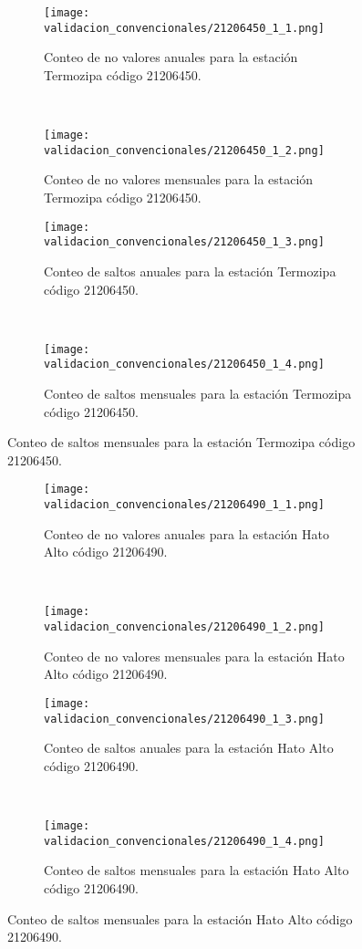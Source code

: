 \begin{figure}[H]\ContinuedFloat
\centering
	\begin{subfigure}[normla]{0.4\textwidth}
	\texttt{[image: validacion\_convencionales/21206450\_1\_1.png]}
		\caption{Conteo de no valores anuales para la estación Termozipa código 21206450.}
		\label{subfig:a1}
		\end{subfigure}
		~
    \begin{subfigure}[normla]{0.4\textwidth}
	\texttt{[image: validacion\_convencionales/21206450\_1\_2.png]}
		\caption{Conteo de no valores mensuales para la estación Termozipa código 21206450.}
		\label{subfig:a2}
		\end{subfigure}
		
    \begin{subfigure}[normla]{0.4\textwidth}
	\texttt{[image: validacion\_convencionales/21206450\_1\_3.png]}
		\caption{Conteo de saltos anuales para la estación Termozipa código 21206450.}
		\label{subfig:a1}
		\end{subfigure}
		~
    \begin{subfigure}[normla]{0.4\textwidth}
	\texttt{[image: validacion\_convencionales/21206450\_1\_4.png]}
		\caption{Conteo de saltos mensuales para la estación Termozipa código 21206450.}
		\label{subfig:a2}
		\end{subfigure}

	
\end{figure}
           
\begin{figure}[H]\ContinuedFloat
\centering
	\begin{subfigure}[normla]{0.4\textwidth}
	\texttt{[image: validacion\_convencionales/21206490\_1\_1.png]}
		\caption{Conteo de no valores anuales para la estación Hato Alto código 21206490.}
		\label{subfig:a1}
		\end{subfigure}
		~
    \begin{subfigure}[normla]{0.4\textwidth}
	\texttt{[image: validacion\_convencionales/21206490\_1\_2.png]}
		\caption{Conteo de no valores mensuales para la estación Hato Alto código 21206490.}
		\label{subfig:a2}
		\end{subfigure}
		
    \begin{subfigure}[normla]{0.4\textwidth}
	\texttt{[image: validacion\_convencionales/21206490\_1\_3.png]}
		\caption{Conteo de saltos anuales para la estación Hato Alto código 21206490.}
		\label{subfig:a1}
		\end{subfigure}
		~
    \begin{subfigure}[normla]{0.4\textwidth}
	\texttt{[image: validacion\_convencionales/21206490\_1\_4.png]}
		\caption{Conteo de saltos mensuales para la estación Hato Alto código 21206490.}
		\label{subfig:a2}
		\end{subfigure}

	
\end{figure}
           
